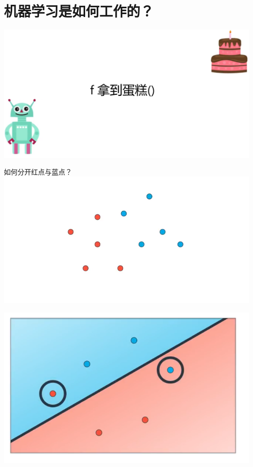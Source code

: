 \documentclass[11pt]{article}
\makeatletter
\def\maxwidth{\ifdim\Gin@nat@width>\linewidth\linewidth
    \else\Gin@nat@width\fi}
\let\Oldincludegraphics\includegraphics
\renewcommand{\includegraphics}[1]{\Oldincludegraphics[width=.8\maxwidth]{#1}}
\makeatother
\begin{document}
    \hypertarget{ux673aux5668ux5b66ux4e60ux662fux5982ux4f55ux5de5ux4f5cux7684}{%
\section{机器学习是如何工作的？}\label{ux673aux5668ux5b66ux4e60ux662fux5982ux4f55ux5de5ux4f5cux7684}}

\includegraphics{img/cake.png}

    如何分开红点与蓝点？ \includegraphics{img/scatter.png}

    \includegraphics{img/2error.png}
\end{document}
